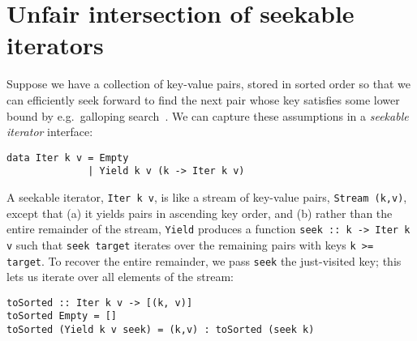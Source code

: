 \documentclass[acmsmall,screen,dvipsnames,svgnames]{acmart}
\newcommand\hask[1]{\texttt{#1}}
\newcommand\ttt\texttt
\newcommand\todo[1]{{\color{Orange}#1}}
\renewcommand\todo[1]{{\color{IndianRed}#1}}
\renewcommand\todo[1]{\ignorespaces}
\begin{document}




\section{Unfair intersection of seekable iterators}
\label{sec:unfair-intersection}

Suppose we have a collection of key-value pairs, stored in sorted order so that we can efficiently seek forward to find the next pair whose key satisfies some lower bound by e.g.\ galloping search~\citep{DBLP:journals/ipl/BentleyY76}.
We can capture these assumptions in a \emph{seekable iterator} interface:

\begin{verbatim}
data Iter k v = Empty
              | Yield k v (k -> Iter k v)
\end{verbatim}

\noindent
A seekable iterator, \hask{Iter k v}, is like a stream of key-value pairs, \hask{Stream (k,v)}, except that (a) it yields pairs in ascending key order, and (b) rather than the entire remainder of the stream, \hask{Yield} produces a function \hask{seek :: k -> Iter k v}
such that
\ttt{seek target} iterates over the remaining pairs with keys \ttt{k >= target}.
%
To recover the entire remainder, we pass \ttt{seek} the just-visited key; this lets us iterate over all elements of the stream:

\begin{verbatim}
toSorted :: Iter k v -> [(k, v)]
toSorted Empty = []
toSorted (Yield k v seek) = (k,v) : toSorted (seek k)
\end{verbatim}
\end{document}
